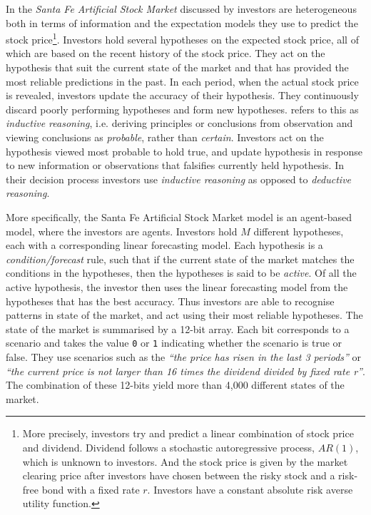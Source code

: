\documentclass[preprint, 12pt]{elsarticle}
\begin{document}
In the \emph{Santa Fe Artificial Stock Market} discussed by \citet[chapter~3, chapter~11]{Arthur_2014} investors are heterogeneous both in terms of information and the expectation models they use to predict the stock price\footnote{More precisely, investors try and predict a linear combination of stock price and dividend. Dividend follows a stochastic autoregressive process, $AR(1)$, which is unknown to investors. And the stock price is given by the market clearing price after investors have chosen between the risky stock and a risk-free bond with a fixed rate $r$. Investors have a constant absolute risk averse utility function.}. Investors hold several hypotheses on the expected stock price, all of which are based on the recent history of the stock price. They act on the hypothesis that suit the current state of the market and that has provided the most reliable predictions in the past. In each period, when the actual stock price is revealed, investors update the accuracy of their hypothesis. They continuously discard poorly performing hypotheses and form new hypotheses. \citet{Arthur_2014} refers to this as \emph{inductive reasoning}, i.e. deriving principles or conclusions from observation and viewing conclusions as \emph{probable}, rather than \emph{certain}. Investors act on the hypothesis viewed most probable to hold true, and update hypothesis in response to new information or observations that falsifies currently held hypothesis. In their decision process investors use \emph{inductive reasoning} as opposed to \emph{deductive reasoning}.

More specifically, the Santa Fe Artificial Stock Market model is an agent-based model, where the investors are agents. Investors hold $M$ different hypotheses, each with a corresponding linear forecasting model. Each hypothesis is a \emph{condition/forecast} rule, such that if the current state of the market matches the conditions in the hypotheses, then the hypotheses is said to be \emph{active}. Of all the active hypothesis, the investor then uses the linear forecasting model from the hypotheses that has the best accuracy. Thus investors are able to recognise patterns in state of the market, and act using their most reliable hypotheses. The state of the market is summarised by a 12-bit array. Each bit corresponds to a scenario and takes the value \texttt{0} or \texttt{1} indicating whether the scenario is true or false. They use scenarios such as the \emph{``the price has risen in the last 3 periods''} or \emph{``the current price is not larger than 16 times the dividend divided by fixed rate r''}. The combination of these 12-bits yield more than 4,000 different states of the market. 
\end{document}
